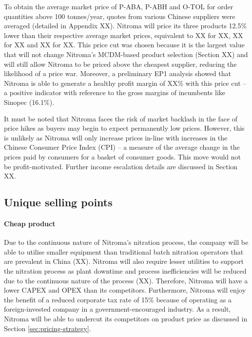 To obtain the average market price of P-ABA, P-ABH and O-TOL for order quantities above 100 tonnes/year, quotes from various Chinese suppliers were averaged (detailed in Appendix XX).  Nitroma will price its three products 12.5\% lower than their respective average market prices, equivalent to XX for XX, XX for XX and XX for XX. This price cut was chosen because it is the largest value that will not change Nitroma’s MCDM-based product selection (Section XX) and will still allow Nitroma to be priced above the cheapest supplier, reducing the likelihood of a price war. Moreover, a preliminary EP1 analysis showed that Nitroma is able to generate a healthy profit margin of XX\% with this price cut – a positive indicator with reference to the gross margins of incumbents like Sinopec (16.1\%). 

It must be noted that Nitroma faces the risk of market backlash in the face of price hikes as buyers may begin to expect permanently low prices. However, this is unlikely as Nitroma will only increase prices in-line with increases in the Chinese Consumer Price Index (CPI) – a measure of the average change in the prices paid by consumers for a basket of consumer goods. This move would not be profit-motivated. Further income escalation details are discussed in Section XX.

\subsection{Unique selling points}
\label{sec:USP}
\paragraph{Cheap product}
Due to the continuous nature of Nitroma’s nitration process, the company will be able to utilise smaller equipment than traditional batch nitration operators that are prevalent in China (XX). Nitroma will also require lesser utilities to support the nitration process as plant downtime and process inefficiencies will be reduced due to the continuous nature of the process (XX). Therefore, Nitroma will have a lower CAPEX and OPEX than its competitors. Furthermore, Nitroma will enjoy the benefit of a reduced corporate tax rate of 15\% because of operating as a foreign-invested company in a government-encouraged industry. As a result, Nitroma will be able to undercut its competitors on product price as discussed in Section \ref{sec:pricing-strategy}.

